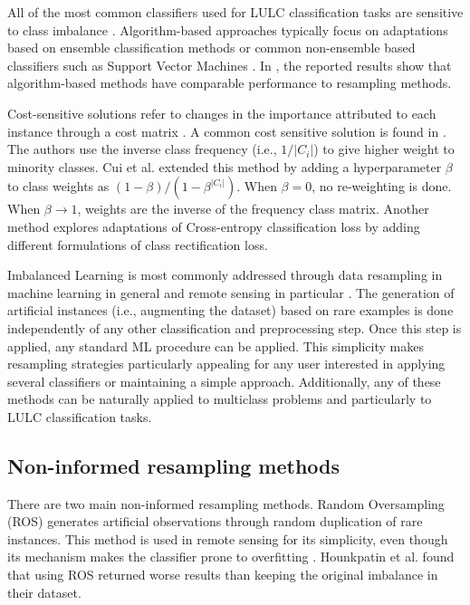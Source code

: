 \documentclass[parskip=full]{scrartcl}
\begin{document}
All of the most common classifiers used for LULC classification tasks
\cite{Khatami2016, Gavade2019} are sensitive to class imbalance
\cite{Blagus2010}. Algorithm-based approaches typically focus on
adaptations based on ensemble classification methods \cite{Mellor2015} or
common non-ensemble based classifiers such as Support Vector Machines
\cite{Shao2014}. In \cite{Lee2016}, the reported results show
that algorithm-based methods have comparable performance to resampling methods.

Cost-sensitive solutions refer to changes in the importance attributed to each
instance through a cost matrix \cite{Huang2016,Cui2019,Dong2017}. A common cost sensitive
solution is found in \cite{Huang2016}. The authors use the inverse class
frequency (i.e., $1/|C_i|$) to give higher weight to minority
classes. Cui et al. \cite{Cui2019} extended this method by adding a
hyperparameter $\beta$ to class weights as
$(1-\beta)/(1-\beta^{|C_i|})$. When $\beta=0$, no re-weighting is done.
When $\beta\rightarrow 1$, weights are the inverse of the frequency class
matrix. Another method \cite{Dong2017} explores adaptations of
Cross-entropy classification loss by adding different formulations of class
rectification loss.

Imbalanced Learning is most commonly addressed through data resampling in
machine learning in general and remote sensing in particular
\cite{Feng2019}. The generation of artificial instances (i.e.,
augmenting the dataset) based on rare examples is done independently of any
other classification and preprocessing step. Once this step is applied, any
standard ML procedure can be applied. This simplicity makes resampling
strategies particularly appealing for any user interested in applying several
classifiers or maintaining a simple approach. Additionally, any of these
methods can be naturally applied to multiclass problems and particularly to
LULC classification tasks.

\subsection{Non-informed resampling methods}

There are two main non-informed resampling methods. Random Oversampling (ROS)
generates artificial observations through random duplication of rare instances.
This method is used in remote sensing \cite{Sharififar2019, Hounkpatin2018} for its
simplicity, even though its mechanism makes the classifier prone to overfitting
\cite{Krawczyk2016}. Hounkpatin et al. \cite{Hounkpatin2018} found that
using ROS returned worse results than keeping the original imbalance in their
dataset.
\end{document}
